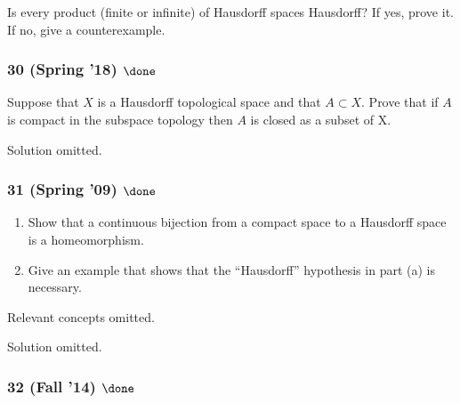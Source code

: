 \begin{problem}[?]

Is every product (finite or infinite) of Hausdorff spaces Hausdorff? If
yes, prove it. If no, give a counterexample.

\end{problem}

\hypertarget{spring-18-done}{%
\subsubsection{\texorpdfstring{30 (Spring '18)
\(\done\)}{30 (Spring '18) \textbackslash done}}\label{spring-18-done}}

\begin{problem}[?]

Suppose that \(X\) is a Hausdorff topological space and that
\(A \subset X\). Prove that if \(A\) is compact in the subspace topology
then \(A\) is closed as a subset of X.

\end{problem}

Solution omitted.

\hypertarget{spring-09-done}{%
\subsubsection{\texorpdfstring{31 (Spring '09)
\(\done\)}{31 (Spring '09) \textbackslash done}}\label{spring-09-done}}

\begin{problem}[Spring 2009, 31]

\envlist

\begin{enumerate}
\def\labelenumi{\alph{enumi}.}
\item
  Show that a continuous bijection from a compact space to a Hausdorff
  space is a homeomorphism.
\item
  Give an example that shows that the ``Hausdorff'' hypothesis in part
  (a) is necessary.
\end{enumerate}

\end{problem}

Relevant concepts omitted.

Solution omitted.

\hypertarget{fall-14-done-1}{%
\subsubsection{\texorpdfstring{32 (Fall '14)
\(\done\)}{32 (Fall '14) \textbackslash done}}\label{fall-14-done-1}}

